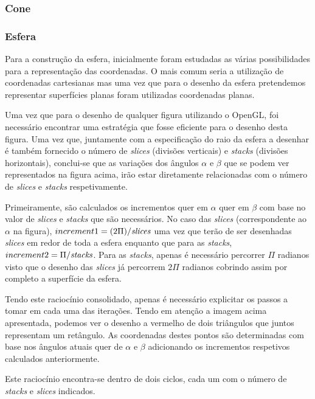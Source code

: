 \documentclass[a4paper]{article}
\begin{document}
\subsubsection{Cone} %

\subsubsection{Esfera} %

\hspace{3mm} Para a construção da esfera, inicialmente foram estudadas as várias possibilidades para a representação das coordenadas. O mais comum seria a utilização de coordenadas cartesianas mas uma vez que para o desenho da esfera pretendemos representar superfícies planas foram utilizadas coordenadas planas.


\par Uma vez que para o desenho de qualquer figura utilizando o OpenGL, foi necessário encontrar uma estratégia que fosse eficiente para o desenho desta figura. Uma vez que, juntamente com a especificação do raio da esfera a desenhar é também fornecido o número de \emph{slices} (divisões verticais) e \emph{stacks} (divisões horizontais), conclui-se que as variações dos ângulos $\alpha$ e $\beta$ que se podem ver representados na figura acima, irão estar diretamente relacionadas com o número de \emph{slices} e \emph{stacks} respetivamente.
\par Primeiramente, são calculados os incrementos quer em $\alpha$ quer em $\beta$ com base no valor de \emph{slices} e \emph{stacks} que são necessários. No caso das \emph{slices} (correspondente ao $\alpha$ na figura), $increment1 = (2\Pi) / \emph{slices}$ uma vez que terão de ser desenhadas \emph{slices} em redor de toda a esfera enquanto que para as \emph{stacks}, $increment2 = \Pi / \emph{stacks}$. Para as \emph{stacks}, apenas é necessário percorrer $\Pi$ radianos visto que o desenho das \emph{slices} já percorrem $2\Pi$ radianos cobrindo assim por completo a superfície da esfera.
\par Tendo este raciocínio consolidado, apenas é necessário explicitar os passos a tomar em cada uma das iterações. Tendo em atenção a imagem acima apresentada, podemos ver o desenho a vermelho de dois triângulos que juntos representam um retângulo. As coordenadas destes pontos são determinadas com base nos ângulos atuais quer de $\alpha$ e $\beta$ adicionando os incrementos respetivos calculados anteriormente.
\par Este raciocínio encontra-se dentro de dois ciclos, cada um com o número de \emph{stacks} e \emph{slices} indicados.
\end{document}
